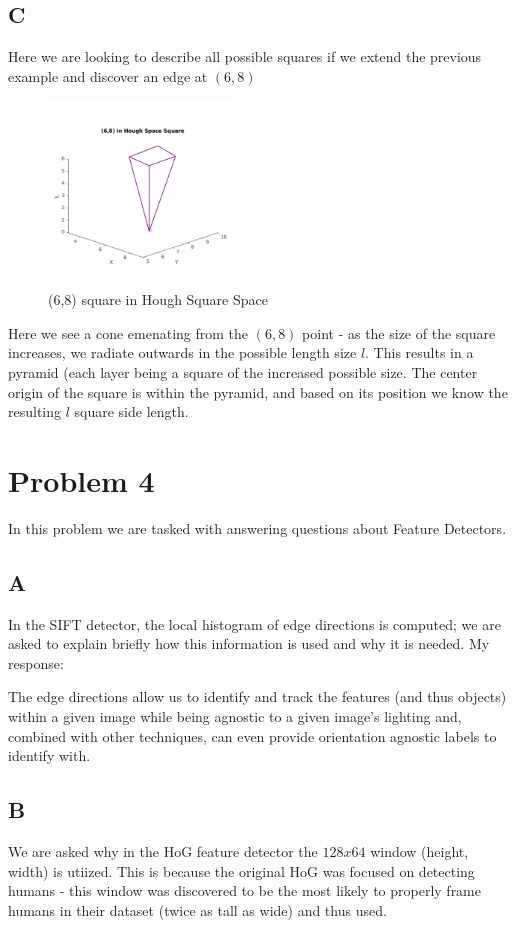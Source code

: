 \documentclass{article}
\begin{document}
\subsection*{C}

Here we are looking to describe all possible squares if we extend the previous example and discover an edge at $(6,8)$

\begin{figure}[H]
    \centering
    \includegraphics[width = 0.45\textwidth]{imgs/prob3_c.jpg}
    \caption{(6,8) square in Hough Square Space}
    \label{fig:prob3_c}
\end{figure}

Here we see a cone emenating from the $(6,8)$ point - as the size of the square increases, we radiate outwards in the possible length size $l$. This results in a pyramid (each layer being a square of the increased possible size. The center origin of the square is within the pyramid, and based on its position we know the resulting $l$ square side length.

\section*{Problem 4}

In this problem we are tasked with answering questions about Feature Detectors.

\subsection*{A}

In the SIFT detector, the local histogram of edge directions is computed; we are asked to explain briefly how this information is used and why it is needed. My response:

The edge directions allow us to identify and track the features (and thus objects) within a given image while being agnostic to a given image's lighting and, combined with other techniques, can even provide orientation agnostic labels to identify with.

\subsection*{B}

We are asked why in the HoG feature detector the $128x64$ window (height, width) is utiized. This is because the original HoG was focused on detecting humans - this window was discovered to be the most likely to properly frame humans in their dataset (twice as tall as wide) and thus used.
\end{document}
